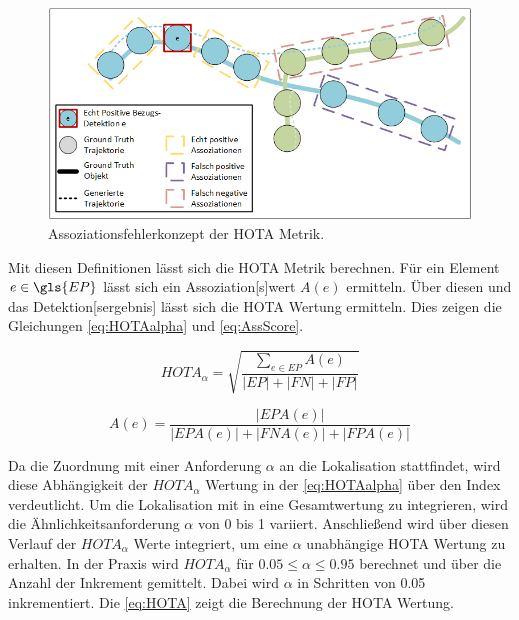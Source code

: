 \begin{figure}[htp]
    \centering
    \includegraphics[width=\textwidth]{img/Grafiken/HOTA Assoziationsfehlerkonzept.png}
    \caption{Assoziationsfehlerkonzept der HOTA Metrik. \cite{HOTA}}
    \label{fig:KonzeptAssHOTA}
\end{figure}

Mit diesen Definitionen lässt sich die \gls{HOTA} Metrik berechnen. Für ein Element \(e \in \gls{EP}\) lässt sich ein \gls{Assoziation}[s]wert \(A(e)\) ermitteln. Über diesen und das \gls{Detektion}[sergebnis] lässt sich die \gls{HOTA} Wertung ermitteln. Dies zeigen die Gleichungen \ref{eq:HOTAalpha} und \ref{eq:AssScore}.

\begin{equation}
    \label{eq:HOTAalpha}
    HOTA_{\alpha} = \sqrt{\frac{\sum_{e \in EP} A(e)}{|EP| + |FN| + |FP|}}
\end{equation}

\begin{equation}
    \label{eq:AssScore}
    A(e) = \frac{|EPA(e)|}{|EPA(e)| + |FNA(e)| + |FPA(e)|}
\end{equation}

Da die Zuordnung mit einer Anforderung \(\alpha\) an die \gls{Lokalisation} stattfindet, wird diese Abhängigkeit der \(HOTA_{\alpha}\) Wertung in der \autoref{eq:HOTAalpha} über den Index verdeutlicht. Um die \gls{Lokalisation} mit in eine Gesamtwertung zu integrieren, wird die Ähnlichkeitsanforderung \(\alpha\) von 0 bis 1 variiert. Anschließend wird über diesen Verlauf der \(HOTA_{\alpha}\) Werte integriert, um eine \(\alpha\) unabhängige \gls{HOTA} Wertung zu erhalten. In der Praxis wird \(HOTA_{\alpha}\) für \(0.05 \leq \alpha \leq 0.95\) berechnet und über die Anzahl der Inkrement gemittelt. Dabei wird \(\alpha\) in Schritten von 0.05 inkrementiert. Die \autoref{eq:HOTA} zeigt die Berechnung der \gls{HOTA} Wertung.

